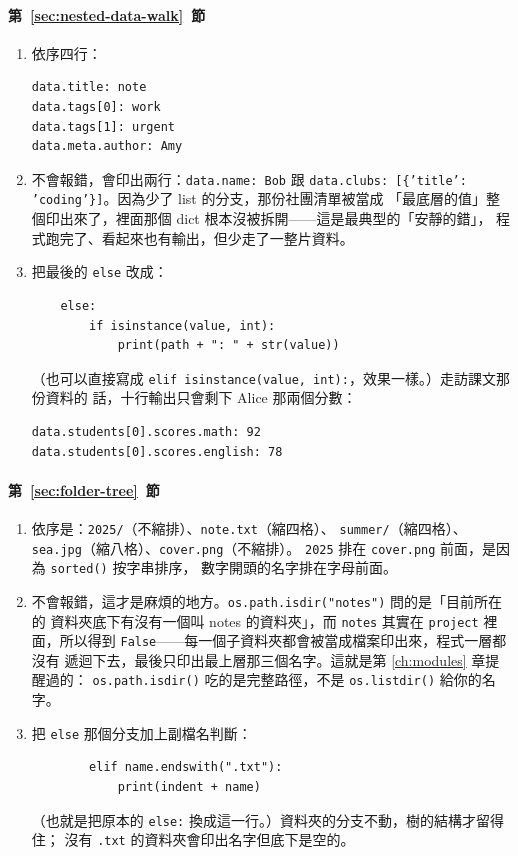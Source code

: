\paragraph{第~\ref{sec:nested-data-walk}~節}
\begin{enumerate}
\item 依序四行：
\begin{verbatim}
data.title: note
data.tags[0]: work
data.tags[1]: urgent
data.meta.author: Amy
\end{verbatim}
\item 不會報錯，會印出兩行：\texttt{data.name: Bob} 跟
\texttt{data.clubs: [\{'title': 'coding'\}]}。因為少了 list 的分支，那份社團清單被當成
「最底層的值」整個印出來了，裡面那個 dict 根本沒被拆開——這是最典型的「安靜的錯」，
程式跑完了、看起來也有輸出，但少走了一整片資料。
\item 把最後的 \texttt{else} 改成：
\begin{verbatim}
    else:
        if isinstance(value, int):
            print(path + ": " + str(value))
\end{verbatim}
（也可以直接寫成 \texttt{elif isinstance(value, int):}，效果一樣。）走訪課文那份資料的
話，十行輸出只會剩下 Alice 那兩個分數：
\begin{verbatim}
data.students[0].scores.math: 92
data.students[0].scores.english: 78
\end{verbatim}
\end{enumerate}

\paragraph{第~\ref{sec:folder-tree}~節}
\begin{enumerate}
\item 依序是：\texttt{2025/}（不縮排）、\texttt{note.txt}（縮四格）、
\texttt{summer/}（縮四格）、\texttt{sea.jpg}（縮八格）、\texttt{cover.png}（不縮排）。
\texttt{2025} 排在 \texttt{cover.png} 前面，是因為 \texttt{sorted()} 按字串排序，
數字開頭的名字排在字母前面。
\item 不會報錯，這才是麻煩的地方。\texttt{os.path.isdir("notes")} 問的是「目前所在的
資料夾底下有沒有一個叫 notes 的資料夾」，而 \texttt{notes} 其實在 \texttt{project}
裡面，所以得到 \texttt{False}——每一個子資料夾都會被當成檔案印出來，程式一層都沒有
遞迴下去，最後只印出最上層那三個名字。這就是第 \ref{ch:modules} 章提醒過的：
\texttt{os.path.isdir()} 吃的是完整路徑，不是 \texttt{os.listdir()} 給你的名字。
\item 把 \texttt{else} 那個分支加上副檔名判斷：
\begin{verbatim}
        elif name.endswith(".txt"):
            print(indent + name)
\end{verbatim}
（也就是把原本的 \texttt{else:} 換成這一行。）資料夾的分支不動，樹的結構才留得住；
沒有 \texttt{.txt} 的資料夾會印出名字但底下是空的。
\end{enumerate}

